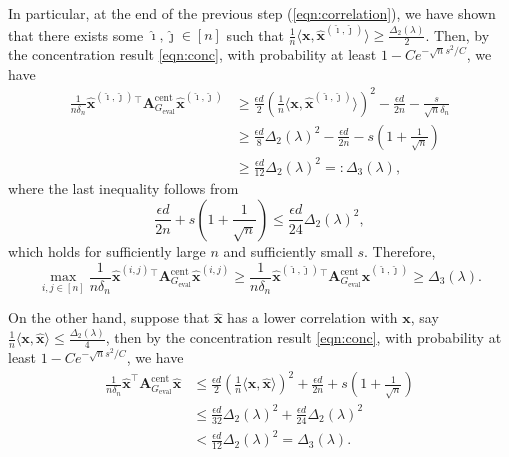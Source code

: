 \documentclass[11pt, titlepage]{article} %
\numberwithin{equation}{section}
\theoremstyle{definition}
\numberwithin{theorem}{section}
\numberwithin{lemma}{section}
\numberwithin{corollary}{section}
\numberwithin{proposition}{section}
\numberwithin{definition}{section}
\numberwithin{remark}{section}
\begin{document}
In particular, at the end of the previous step (\cref{eqn:correlation}), we have shown that 
there exists some $\hat{\imath}, \hat{\jmath} \in [n]$ such that 
$\frac{1}{n} \langle \bm{x}, \hat{\bm{x}}^{(\hat{\imath}, \hat{\jmath})} \rangle \geq \frac{\Delta_2(\lambda)}{2}$.
Then, by the concentration result \ref{eqn:conc}, with probability at least $1 - Ce^{-\sqrt{n}s^2/C}$, we have
\begin{align*}
  \frac{1}{n \delta_n} \hat{\bm{x}}^{(\hat{\imath}, \hat{\jmath})}{}^\top \bm{A}_{G_\mathrm{eval}}^\mathrm{cent} \hat{\bm{x}}^{(\hat{\imath}, \hat{\jmath})} 
  &\geq \frac{\epsilon d}{2} \left(\frac{1}{n} \langle \bm{x}, \hat{\bm{x}}^{(\hat{\imath}, \hat{\jmath})} \rangle\right)^2
  - \frac{\epsilon d}{2n} - \frac{s}{\sqrt{n}\delta_n}\\
  &\geq \frac{\epsilon d}{8} \Delta_2(\lambda)^2 - \frac{\epsilon d}{2n} - s\left(1 + \frac{1}{\sqrt{n}}\right)\\
  &\geq \frac{\epsilon d}{12} \Delta_2(\lambda)^2 =: \Delta_3 (\lambda),
\end{align*}
where the last inequality follows from 
\begin{equation}
\label{eqn:s.choice}
\frac{\epsilon d}{2n} + s\left(1 + \frac{1}{\sqrt{n}}\right) \leq \frac{\epsilon d}{24} \Delta_2(\lambda)^2,
\end{equation}
which holds for sufficiently large $n$ and sufficiently small $s$. Therefore,
\[
\max_{i, j \in [n]} \frac{1}{n\delta_n} \hat{\bm{x}}^{(i,j)}{}^\top \bm{A}_{G_\mathrm{eval}}^\mathrm{cent} \hat{\bm{x}}^{(i,j)}
\geq \frac{1}{n\delta_n} \hat{\bm{x}}^{(\hat{\imath}, \hat{\jmath})}{}^\top \bm{A}_{G_\mathrm{eval}}^\mathrm{cent} \hat{\bm{x}}^{(\hat{\imath}, \hat{\jmath})} 
\geq \Delta_3 (\lambda).
\]

On the other hand, suppose that $\hat{\bm{x}}$ has a lower correlation with $\bm{x}$, say
$\frac{1}{n} \langle \bm{x}, \hat{\bm{x}} \rangle \leq \frac{\Delta_2(\lambda)}{4}$, 
then by the concentration result \ref{eqn:conc}, with probability at least $1 - Ce^{-\sqrt{n}s^2/C}$, we have
\begin{align*}
\frac{1}{n\delta_n} \hat{\bm{x}}^\top \bm{A}_{G_\mathrm{eval}}^\mathrm{cent} \hat{\bm{x}}
&\leq \frac{\epsilon d}{2} \left(\frac{1}{n} \langle \bm{x}, \hat{\bm{x}} \rangle\right)^2 
+ \frac{\epsilon d}{2n} + s\left(1 + \frac{1}{\sqrt{n}}\right)\\
&\leq \frac{\epsilon d}{32} \Delta_2(\lambda)^2 + \frac{\epsilon d}{24} \Delta_2(\lambda)^2\\
&< \frac{\epsilon d}{12} \Delta_2(\lambda)^2 = \Delta_3 (\lambda).
\end{align*}
\end{document}
